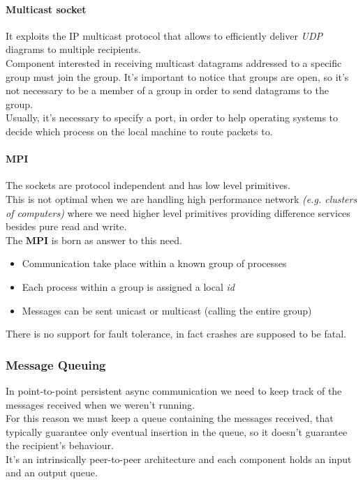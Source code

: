 \paragraph{Multicast socket}

It exploits the IP multicast protocol that allows to efficiently deliver \textit{UDP} diagrams to multiple recipients.\\
Component interested in receiving multicast datagrams addressed to a specific group must join the group. It's important to notice that groups are open, so it's not necessary to be a member of a group in order to send datagrams to the group.\\
Usually, it's necessary to specify a port, in order to help operating systems to decide which process on the local machine to route packets to.

\paragraph{MPI}

The sockets are protocol independent and has low level primitives.\\
This is not optimal when we are handling high performance network \textit{(e.g. clusters of computers)} where we need higher level primitives providing difference services besides pure read and write.\\
The \textbf{MPI} is born as answer to this need.
\begin{itemize}
    \item Communication take place within a known group of processes
    \item Each process within a group is assigned a local \emph{id}
    \item Messages can be sent unicast or multicast (calling the entire group)
\end{itemize}
There is no support for fault tolerance, in fact crashes are supposed to be fatal.

\subsubsection{Message Queuing}\label{message-queuing}

In point-to-point persistent async communication we need to keep track of the messages received when we weren't running.\\
For this reason we must keep a queue containing the messages received, that typically guarantee only eventual insertion in the queue, so it doesn't guarantee the recipient's behaviour.\\
It's an intrinsically peer-to-peer architecture and each component holds an input and an output queue.

